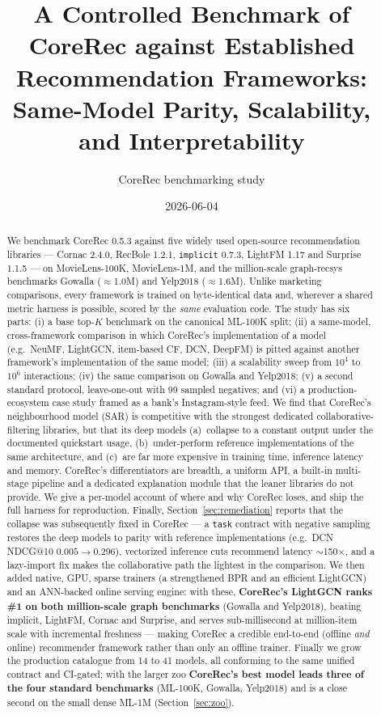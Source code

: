 \documentclass[10pt]{article}
\title{\textbf{A Controlled Benchmark of CoreRec against Established\\
Recommendation Frameworks: Same-Model Parity, Scalability,\\
and Interpretability}}
\author{CoreRec benchmarking study}
\date{2026-06-04}
\begin{document}
\maketitle

\begin{abstract}
We benchmark CoreRec 0.5.3 against five widely used open-source recommendation
libraries --- Cornac 2.4.0, RecBole 1.2.1, \texttt{implicit} 0.7.3, LightFM 1.17
and Surprise 1.1.5 --- on MovieLens-100K, MovieLens-1M, and the million-scale
graph-recsys benchmarks Gowalla ($\approx$1.0M) and Yelp2018 ($\approx$1.6M).
Unlike marketing comparisons, every framework is trained on byte-identical data
and, wherever a shared metric harness is possible, scored by the \emph{same}
evaluation code. The study has six parts: (i) a base top-$K$ benchmark on the
canonical ML-100K split; (ii) a same-model, cross-framework comparison in which
CoreRec's implementation of a model (e.g.\ NeuMF, LightGCN, item-based CF, DCN,
DeepFM) is pitted against another framework's implementation of the same model;
(iii) a scalability sweep from $10^4$ to $10^6$ interactions; (iv) the same
comparison on Gowalla and Yelp2018; (v) a second standard protocol,
leave-one-out with 99 sampled negatives; and (vi) a production-ecosystem case
study framed as a bank's Instagram-style feed. We find that CoreRec's
neighbourhood model (SAR) is competitive with the strongest dedicated
collaborative-filtering libraries, but that its deep models (a)~collapse to a
constant output under the documented quickstart usage, (b)~under-perform
reference implementations of the same architecture, and (c)~are far more
expensive in training time, inference latency and memory. CoreRec's
differentiators are breadth, a uniform API, a built-in multi-stage pipeline and a
dedicated explanation module that the leaner libraries do not provide. We give a
per-model account of where and why CoreRec loses, and ship the full harness for
reproduction. Finally, Section~\ref{sec:remediation} reports that the collapse was
subsequently fixed in CoreRec --- a \texttt{task} contract with negative sampling
restores the deep models to parity with reference implementations (e.g.\ DCN
NDCG@10 $0.005\!\rightarrow\!0.296$), vectorized inference cuts recommend latency
$\sim$150$\times$, and a lazy-import fix makes the collaborative path the lightest
in the comparison. We then added native, GPU, sparse trainers (a strengthened BPR
and an efficient LightGCN) and an ANN-backed online serving engine: with these,
\textbf{CoreRec's LightGCN ranks \#1 on both million-scale graph benchmarks}
(Gowalla and Yelp2018), beating implicit, LightFM, Cornac and Surprise, and serves
sub-millisecond at million-item scale with incremental freshness --- making CoreRec
a credible end-to-end (offline \emph{and} online) recommender framework rather than
only an offline trainer. Finally we grow the production catalogue from 14 to 41
models, all conforming to the same unified contract and CI-gated; with the larger
zoo \textbf{CoreRec's best model leads three of the four standard benchmarks}
(ML-100K, Gowalla, Yelp2018) and is a close second on the small dense ML-1M
(Section~\ref{sec:zoo}).
\end{abstract}
\end{document}
